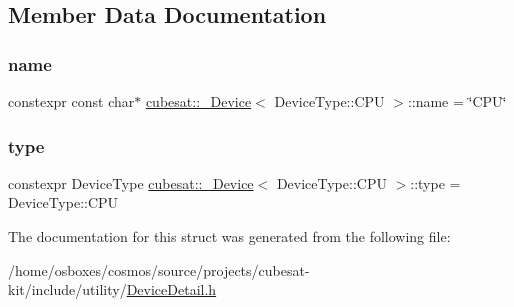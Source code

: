 \subsection{Member Data Documentation}
\mbox{\label{structcubesat_1_1__Device_3_01DeviceType_1_1CPU_01_4_a2541dceeef9a1b93d24c92b016d8fc14}} 
\subsubsection{\texorpdfstring{name}{name}}
{\footnotesize\ttfamily constexpr const char$\ast$ \hyperlink{structcubesat_1_1__Device}{cubesat\+::\+\_\+\+Device}$<$ Device\+Type\+::\+C\+PU $>$\+::name = \char`\"{}C\+PU\char`\"{}\hspace{0.3cm}{\ttfamily [static]}}

\mbox{\label{structcubesat_1_1__Device_3_01DeviceType_1_1CPU_01_4_a962a3e7a7818a91e856a5a5b6c5eaee4}} 
\subsubsection{\texorpdfstring{type}{type}}
{\footnotesize\ttfamily constexpr Device\+Type \hyperlink{structcubesat_1_1__Device}{cubesat\+::\+\_\+\+Device}$<$ Device\+Type\+::\+C\+PU $>$\+::type = Device\+Type\+::\+C\+PU\hspace{0.3cm}{\ttfamily [static]}}



The documentation for this struct was generated from the following file\+:\begin{DoxyCompactItemize}
\item 
/home/osboxes/cosmos/source/projects/cubesat-\/kit/include/utility/\hyperlink{DeviceDetail_8h}{Device\+Detail.\+h}\end{DoxyCompactItemize}
